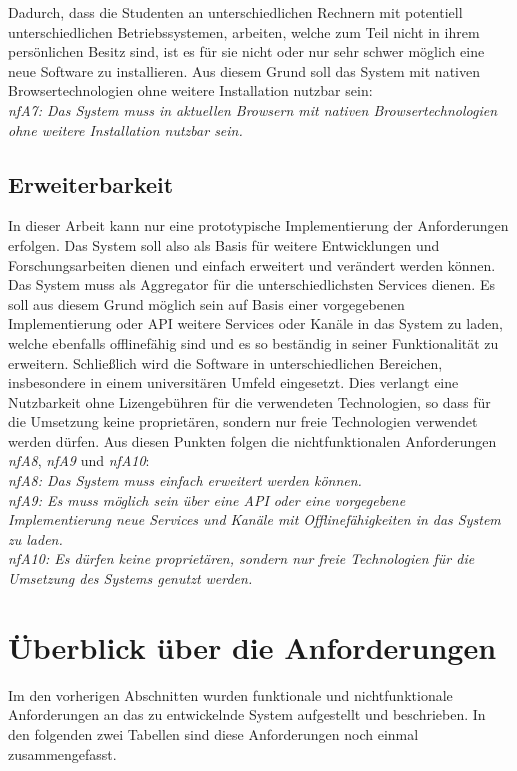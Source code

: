 Dadurch, dass die Studenten an unterschiedlichen Rechnern mit potentiell unterschiedlichen Betriebssystemen, arbeiten, welche zum Teil nicht in ihrem persönlichen Besitz sind, ist es für sie nicht oder nur sehr schwer möglich eine neue Software zu installieren. Aus diesem Grund soll das System mit nativen Browsertechnologien ohne weitere Installation nutzbar sein:\\
\emph{nfA7: Das System muss in aktuellen Browsern mit nativen Browsertechnologien ohne weitere Installation nutzbar sein.}

\subsection{Erweiterbarkeit}
In dieser Arbeit kann nur eine prototypische Implementierung der Anforderungen erfolgen. Das System soll also als Basis für weitere Entwicklungen und Forschungsarbeiten dienen und einfach erweitert und verändert werden können. Das System muss als Aggregator für die unterschiedlichsten Services dienen. Es soll aus diesem Grund möglich sein auf Basis einer vorgegebenen Implementierung oder API weitere Services oder Kanäle in das System zu laden, welche ebenfalls offlinefähig sind und es so beständig in seiner Funktionalität zu erweitern. Schließlich wird die Software in unterschiedlichen Bereichen, insbesondere in einem universitären Umfeld eingesetzt. Dies verlangt eine Nutzbarkeit ohne Lizengebühren für die verwendeten Technologien, so dass für die Umsetzung keine proprietären, sondern nur freie Technologien verwendet werden dürfen. Aus diesen Punkten folgen die nichtfunktionalen Anforderungen \emph{nfA8}, \emph{nfA9} und \emph{nfA10}:\\
\emph{nfA8: Das System muss einfach erweitert werden können.}\\
\emph{nfA9: Es muss möglich sein über eine API oder eine vorgegebene Implementierung neue Services und Kanäle mit Offlinefähigkeiten in das System zu laden.}\\
\emph{nfA10: Es dürfen keine proprietären, sondern nur freie Technologien für die Umsetzung des Systems genutzt werden.}
 
\section{Überblick über die Anforderungen}
Im den vorherigen Abschnitten wurden funktionale und nichtfunktionale Anforderungen an das zu entwickelnde System aufgestellt und beschrieben. In den folgenden zwei Tabellen sind diese Anforderungen noch einmal zusammengefasst.

